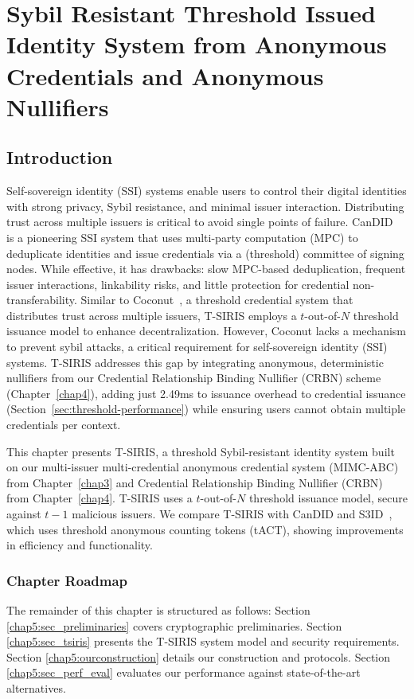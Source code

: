 \chapter{Sybil Resistant Threshold Issued Identity System from Anonymous Credentials and Anonymous Nullifiers}\label{chap6}

\section{Introduction}\label{sec:threshold-intro}
Self-sovereign identity (SSI) systems enable users to control their digital identities with strong privacy, Sybil resistance, and minimal issuer interaction. Distributing trust across multiple issuers is critical to avoid single points of failure. CanDID~\cite{maram_candid_2020} is a pioneering SSI system that uses multi-party computation (MPC) to deduplicate identities and issue credentials via a (threshold) committee of signing nodes. While effective, it has drawbacks: slow MPC-based deduplication, frequent issuer interactions, linkability risks, and little protection for credential non-transferability. Similar to Coconut~\cite{sonnino_coconut_2020}, a threshold credential system that distributes trust across multiple issuers, T-SIRIS employs a $t$-out-of-$N$ threshold issuance model to enhance decentralization. However, Coconut lacks a mechanism to prevent sybil attacks, a critical requirement for self-sovereign identity (SSI) systems. T-SIRIS addresses this gap by integrating anonymous, deterministic nullifiers from our Credential Relationship Binding Nullifier (CRBN) scheme (Chapter~\ref{chap4}), adding just 2.49ms to issuance overhead to credential issuance (Section~\ref{sec:threshold-performance}) while ensuring users cannot obtain multiple credentials per context.

This chapter presents T-SIRIS, a threshold Sybil-resistant identity system built on our multi-issuer multi-credential anonymous credential system (MIMC-ABC) from Chapter~\ref{chap3} and Credential Relationship Binding Nullifier (CRBN) from Chapter~\ref{chap4}. T-SIRIS uses a $t$-out-of-$N$ threshold issuance model, secure against $t-1$ malicious issuers. We compare T-SIRIS with CanDID and S3ID~\cite{rabaninejad_attribute-based_2024}, which uses threshold anonymous counting tokens (tACT), showing improvements in efficiency and functionality.


\subsection*{Chapter Roadmap}
The remainder of this chapter is structured as follows: Section \ref{chap5:sec_preliminaries} covers cryptographic preliminaries. Section \ref{chap5:sec_tsiris} presents the T-SIRIS system model and security requirements. Section \ref{chap5:ourconstruction} details our construction and protocols. Section \ref{chap5:sec_perf_eval} evaluates our performance against state-of-the-art alternatives.

